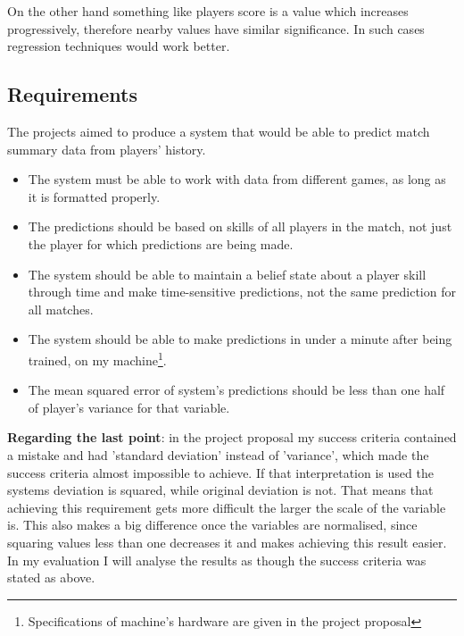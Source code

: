 \documentclass[12pt,a4paper]{book}
\begin{document}
On the other hand something like players score is a value which increases progressively, therefore nearby values have similar significance.
In such cases regression techniques would work better.
\subsection{Requirements}
The projects aimed to produce a system that would be able to predict match summary data from players' history.
\begin{itemize}
\item The system must be able to work with data from different games, as long as it is formatted properly.
\item The predictions should be based on skills of all players in the match, not just the player for which predictions are being made.
\item The system should be able to maintain a belief state about a player skill through time and make time-sensitive predictions, not the same prediction for all matches.
\item The system should be able to make predictions in under a minute after being trained, on my machine\footnote{Specifications of machine's hardware are given in the project proposal}.
\item The mean squared error of system's predictions should be less than one half of player's variance for that variable.
\end{itemize}
\label{requirements-error}
\textbf{Regarding the last point}: in the project proposal my success criteria contained a mistake and had 'standard deviation' instead of 'variance', which made the success criteria almost impossible to achieve.
If that interpretation is used the systems deviation is squared, while original deviation is not.
That means that achieving this requirement gets more difficult the larger the scale of the variable is.
This also makes a big difference once the variables are normalised, since squaring values less than one decreases it and makes achieving this result easier.
In my evaluation I will analyse the results as though the success criteria was stated as above.
\end{document}
